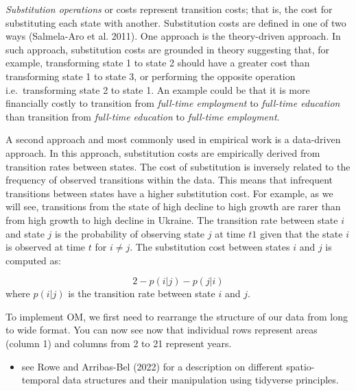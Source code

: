 \documentclass[
  letterpaper,
  DIV=11,
  numbers=noendperiod]{scrreprt}
\providecommand{\tightlist}{%
  \setlength{\itemsep}{0pt}\setlength{\parskip}{0pt}}\usepackage{longtable,booktabs,array}
\begin{document}
\emph{Substitution operations} or costs represent transition costs; that
is, the cost for substituting each state with another. Substitution
costs are defined in one of two ways (Salmela-Aro et al. 2011). One
approach is the theory-driven approach. In such approach, substitution
costs are grounded in theory suggesting that, for example, transforming
state 1 to state 2 should have a greater cost than transforming state 1
to state 3, or performing the opposite operation i.e.~transforming state
2 to state 1. An example could be that it is more financially costly to
transition from \emph{full-time employment} to \emph{full-time
education} than transition from \emph{full-time education} to
\emph{full-time employment}.

A second approach and most commonly used in empirical work is a
data-driven approach. In this approach, substitution costs are
empirically derived from transition rates between states. The cost of
substitution is inversely related to the frequency of observed
transitions within the data. This means that infrequent transitions
between states have a higher substitution cost. For example, as we will
see, transitions from the state of high decline to high growth are rarer
than from high growth to high decline in Ukraine. The transition rate
between state \(i\) and state \(j\) is the probability of observing
state \(j\) at time \(t1\) given that the state \(i\) is observed at
time \(t\) for \(i \neq j\). The substitution cost between states \(i\)
and \(j\) is computed as:

\[
2 - {p(i | j) - p(j | i)}
\] where \(p(i | j)\) is the transition rate between state \(i\) and
\(j\).

To implement OM, we first need to rearrange the structure of our data
from long to wide format. You can now see now that individual rows
represent areas (column 1) and columns from 2 to 21 represent years.

\begin{itemize}
\tightlist
\item
  see Rowe and Arribas-Bel (2022) for a description on different
  spatio-temporal data structures and their manipulation using tidyverse
  principles.
\end{itemize}
\end{document}
